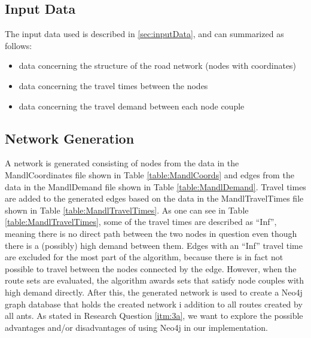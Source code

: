 \subsection{Input Data}
The input data used is described in \vref{sec:inputData}, and can summarized as follows:
\begin{itemize}
\item data concerning the structure of the road network (nodes with coordinates)
\item data concerning the travel times between the nodes 
\item data concerning the travel demand between each node couple
\end{itemize}

\subsection{Network Generation}
A network is generated consisting of nodes from the data in the MandlCoordinates file shown in Table \vref{table:MandlCoords} and edges from the data in the MandlDemand file shown in Table \vref{table:MandlDemand}. Travel times are added to the generated edges based on the data in the MandlTravelTimes file shown in Table \vref{table:MandlTravelTimes}. As one can see in Table \ref{table:MandlTravelTimes}, some of the travel times are described as ``Inf'', meaning there is no direct path between the two nodes in question even though there is a (possibly) high demand between them. Edges with an ``Inf'' travel time are excluded for the most part of the algorithm, because there is in fact not possible to travel between the nodes connected by the edge. However, when the route sets are evaluated, the algorithm awards sets that satisfy node couples with high demand directly. After this, the generated network is used to create a Neo4j graph database that holds the created network i addition to all routes created by all ants. As stated in Research Question \vref{itm:3a}, we want to explore the possible advantages and/or disadvantages of using Neo4j in our implementation.
